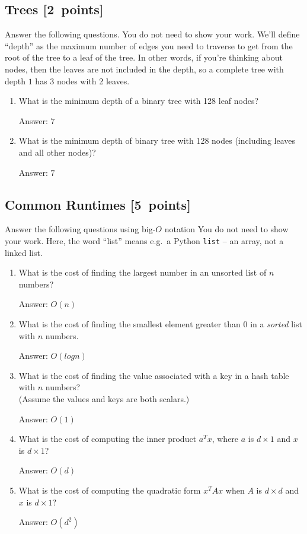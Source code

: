 \documentclass{article}
\newcommand{\blu}[1]{{\textcolor{blu}{#1}}}
\newenvironment{answer}{\par\begingroup\color{gre}Answer: }{\endgroup}
\let\ask\blu
\newcommand\pts[1]{\textcolor{pointscolour}{[#1~points]}}
\begin{document}
  \subsection{Trees \pts{2}}

  \ask{Answer the following questions.} You do not need to show your work. We'll define ``depth'' as the maximum number of edges you need to traverse to get from the root of the tree to a leaf of the tree. In other words, if you're thinking about nodes, then the leaves are not included in the depth, so a complete tree with depth $1$ has 3 nodes with 2 leaves.


  \begin{enumerate}
  \item What is the minimum depth of a binary tree with 128 leaf nodes?
  \begin{answer}
    $7$
  \end{answer}
  \item What is the minimum depth of binary tree with 128 nodes (including leaves and all other nodes)?
  \begin{answer}
    $7$
  \end{answer}
  \end{enumerate}

  \subsection{Common Runtimes \pts{5}}

  \ask{Answer the following questions using big-$O$ notation} You do not need to show your work.
  Here, the word ``list'' means e.g.\ a Python \texttt{list} -- an array, not a linked list.
  \begin{enumerate}
  \item What is the cost of finding the largest number in an unsorted list of $n$ numbers?
  \begin{answer}
    $O(n)$
  \end{answer}
  \item What is the cost of finding the smallest element greater than 0 in a \emph{sorted} list with $n$ numbers.
  \begin{answer}
    $O(log n)$
  \end{answer}
  \item What is the cost of finding the value associated with a key in a hash table with $n$ numbers? \\(Assume the values and keys are both scalars.)
  \begin{answer}
    $O(1)$
  \end{answer}
  \item What is the cost of computing the inner product $a^Tx$, where $a$ is $d \times 1$ and $x$ is $d \times 1$?
  \begin{answer}
    $O(d)$
  \end{answer}
  \item What is the cost of computing the quadratic form $x^TAx$ when $A$ is $d \times d$ and $x$ is $d \times 1$?
  \begin{answer}
    $O(d^2)$
  \end{answer}
  \end{enumerate}
\end{document}
